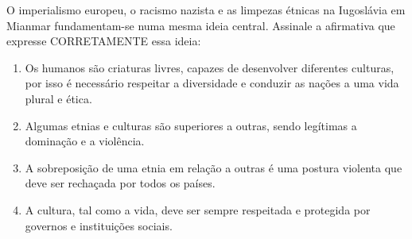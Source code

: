 O imperialismo europeu, o racismo nazista e as limpezas étnicas na Iugoslávia em Mianmar fundamentam-se numa mesma ideia central. Assinale a afirmativa que expresse CORRETAMENTE essa ideia:\begin{enumerate}
\item Os humanos são criaturas livres, capazes de desenvolver diferentes culturas, por isso é necessário
        respeitar a diversidade e conduzir as nações a uma vida plural e ética.
\item Algumas etnias e culturas são superiores a outras, sendo legítimas a dominação e a violência.
\item A sobreposição de uma etnia em relação a outras é uma postura violenta que deve ser rechaçada por
        todos os países.
\item A cultura, tal como a vida, deve ser sempre respeitada e protegida por governos e instituições sociais.\end{enumerate}
